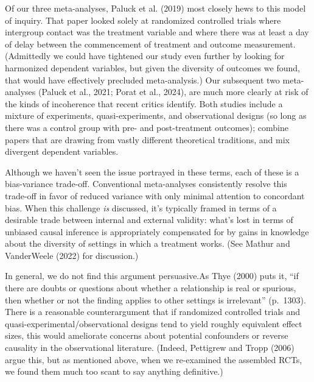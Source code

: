 \documentclass[
  man]{apa6}
\begin{document}
Of our three meta-analyses, Paluck et al. (2019) most closely hews to this model of inquiry. That paper looked solely at randomized controlled trials where intergroup contact was the treatment variable and where there was at least a day of delay between the commencement of treatment and outcome measurement. (Admittedly we could have tightened our study even further by looking for harmonized dependent variables, but given the diversity of outcomes we found, that would have effectively precluded meta-analysis.) Our subsequent two meta-analyses (Paluck et al., 2021; Porat et al., 2024), are much more clearly at risk of the kinds of incoherence that recent critics identify. Both studies include a mixture of experiments, quasi-experiments, and observational designs (so long as there was a control group with pre- and post-treatment outcomes); combine papers that are drawing from vastly different theoretical traditions, and mix divergent dependent variables.

Although we haven't seen the issue portrayed in these terms, each of these is a bias-variance trade-off. Conventional meta-analyses consistently resolve this trade-off in favor of reduced variance with only minimal attention to concordant bias. When this challenge \emph{is} discussed, it's typically framed in terms of a desirable trade between internal and external validity: what's lost in terms of unbiased causal inference is appropriately compensated for by gains in knowledge about the diversity of settings in which a treatment works. (See Mathur and VanderWeele (2022) for discussion.)

In general, we do not find this argument persuasive.As Thye (2000) puts it, ``if there are doubts or questions about whether a relationship is real or spurious, then whether or not the finding applies to other settings is irrelevant'' (p.~1303). There is a reasonable counterargument that if randomized controlled trials and quasi-experimental/observational designs tend to yield roughly equivalent effect sizes, this would ameliorate concerns about potential confounders or reverse causality in the observational literature. (Indeed, Pettigrew and Tropp (2006) argue this, but as mentioned above, when we re-examined the assembled RCTs, we found them much too scant to say anything definitive.)
\end{document}
